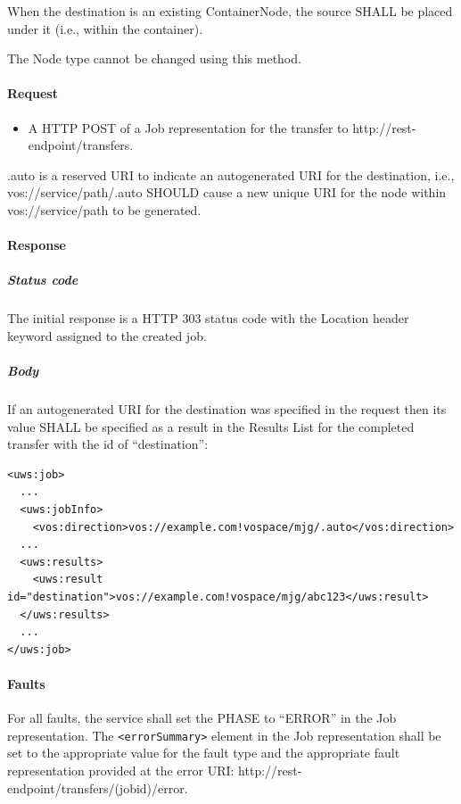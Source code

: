 \documentclass[11pt,a4paper]{ivoa}
\begin{document}
When the destination is an existing ContainerNode, the source SHALL be placed under it (i.e., within the container).

The Node type cannot be changed using this method.

\paragraph{Request}
\begin{itemize}
    \item A HTTP POST of a Job representation for the transfer to http://rest-endpoint/transfers.
\end{itemize}

.auto is a reserved URI to indicate an autogenerated URI for the destination, i.e., vos://service/path/.auto SHOULD cause a new unique URI for the node within vos://service/path to be generated.

\paragraph{Response}
\subparagraph{Status code} The initial response is a HTTP 303 status code with the Location header keyword assigned to the created job.
\subparagraph{Body}
If an autogenerated URI for the destination was specified in the request then its value SHALL be specified as a result in the Results List for the completed transfer with the id of ``destination'':
\begin{lstlisting}
<uws:job>
  ...
  <uws:jobInfo>
    <vos:direction>vos://example.com!vospace/mjg/.auto</vos:direction>
  ...
  <uws:results>
    <uws:result id="destination">vos://example.com!vospace/mjg/abc123</uws:result>
  </uws:results>
  ...
</uws:job>
\end{lstlisting}

\paragraph{Faults}

For all faults, the service shall set the PHASE to ``ERROR'' in the Job representation. The \verb|<errorSummary>| element in the Job representation shall be set to the appropriate value for the fault type and the appropriate fault representation provided at the error URI: http://rest-endpoint/transfers/(jobid)/error.
\end{document}

